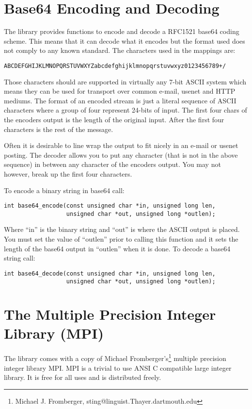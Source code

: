 \documentclass{book}
\begin{document}
\section{Base64 Encoding and Decoding}
The library provides functions to encode and decode a RFC1521 base64 coding scheme.  This means that it can decode what it 
encodes but the format used does not comply to any known standard.  The characters used in the mappings are:
\begin{verbatim}
ABCDEFGHIJKLMNOPQRSTUVWXYZabcdefghijklmnopqrstuvwxyz0123456789+/
\end{verbatim}
Those characters should are supported in virtually any 7-bit ASCII system which means they can be used for transport over
common e-mail, usenet and HTTP mediums.  The format of an encoded stream is just a literal sequence of ASCII characters
where a group of four represent 24-bits of input.  The first four chars of the encoders output is the length of the 
original input.  After the first four characters is the rest of the message.

Often it is desirable to line wrap the output to fit nicely in an e-mail or usenet posting.  The decoder allows you to
put any character (that is not in the above sequence) in between any character of the encoders output.  You may not however,
break up the first four characters.

To encode a binary string in base64 call:
   
\begin{verbatim}
int base64_encode(const unsigned char *in, unsigned long len, 
                  unsigned char *out, unsigned long *outlen);
\end{verbatim}
Where ``in'' is the binary string and ``out'' is where the ASCII output is placed.  You must set the value of ``outlen'' prior
to calling this function and it sets the length of the base64 output in ``outlen'' when it is done.  To decode a base64 
string call:
\begin{verbatim}
int base64_decode(const unsigned char *in, unsigned long len, 
                  unsigned char *out, unsigned long *outlen);
\end{verbatim}

\section{The Multiple Precision Integer Library (MPI)}
The library comes with a copy of Michael Fromberger's\footnote{Michael J. Fromberger, sting@linguist.Thayer.dartmouth.edu} multiple
precision integer library MPI.  MPI is a trivial to use ANSI C compatible large integer library.  It is free for all uses and
is distributed freely.
\end{document}
